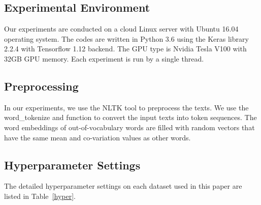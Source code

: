 \documentclass[11pt,a4paper]{article}
\begin{document}
\subsection{Experimental Environment}

Our experiments are conducted on a cloud Linux server with Ubuntu 16.04 operating system.
The codes are written in Python 3.6 using the Keras library 2.2.4 with Tensorflow 1.12 backend.
The GPU type is Nvidia Tesla V100 with 32GB GPU memory.
Each experiment is run by a single thread.



\subsection{Preprocessing}

In our experiments, we use the NLTK tool to preprocess the texts.
We use the word\_tokenize and function to convert the input texts into token sequences.
The word embeddings of out-of-vocabulary words are filled with random vectors that have the same mean and co-variation values as other words. 




\subsection{Hyperparameter Settings}

The detailed hyperparameter settings on each dataset used in this paper are listed in Table~\ref{hyper}.
\end{document}
